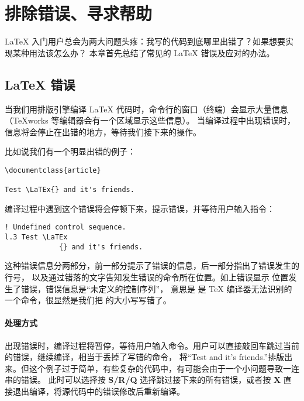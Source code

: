 \chapter{排除错误、寻求帮助}\label{chap:error-helps}

\begin{intro}
\LaTeX{} 入门用户总会为两大问题头疼：我写的代码到底哪里出错了？如果想要实现某种用法该怎么办？
本章首先总结了常见的 \LaTeX{} 错误及应对的办法。
\end{intro}

\section{\LaTeX{} 错误}\label{sec:errors}

当我们用排版引擎编译 \LaTeX{} 代码时，命令行的窗口（终端）会显示大量信息（TeXworks 等编辑器会有一个区域显示这些信息）。
当编译过程中出现错误时，信息将会停止在出错的地方，等待我们接下来的操作。

比如说我们有一个明显出错的例子：
\begin{verbatim}
\documentclass{article}

Test \LaTEx{} and it's friends.

\end{verbatim}

编译过程中遇到这个错误将会停顿下来，提示错误，并等待用户输入指令：
\begin{verbatim}
! Undefined control sequence.
l.3 Test \LaTEx
             {} and it's friends.
\end{verbatim}

这种错误信息分两部分，前一部分提示了错误的信息，后一部分指出了错误发生的行号，
以及通过错落的文字告知发生错误的命令所在位置。如上错误显示  位置发生了错误，错误信息是“未定义的控制序列”，
意思是  是 \TeX{} 编译器无法识别的一个命令，很显然是我们把  的大小写写错了。

\subsubsection{处理方式}

出现错误时，编译过程将暂停，等待用户输入命令。用户可以直接敲回车跳过当前的错误，继续编译，相当于丢掉了写错的命令，
将“Test and it's friends.”排版出来。但这个例子过于简单，有些复杂的代码中，有可能会由于一个小问题导致一连串的错误。
此时可以选择按 \textbf{S/R/Q} 选择跳过接下来的所有错误，或者按 \textbf{X} 直接退出编译，将源代码中的错误修改后重新编译。

